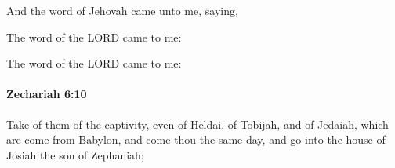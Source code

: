 			\begin{versebox}
					\item[BHS] 
					\item[LXX] 
					\item[ASV] And the word of Jehovah came unto me, saying,
					\item[NIV] The word of the LORD came to me:
					\item[NRSV] The word of the LORD came to me:
			\end{versebox}

		\paragraph{Zechariah 6:10} %
			\label{ZECHARIAH-6-10}

			Take of them of the captivity, even of Heldai, of Tobijah, and of Jedaiah, which are come from Babylon, and come thou the same day, and go into the house of Josiah the son of Zephaniah;


